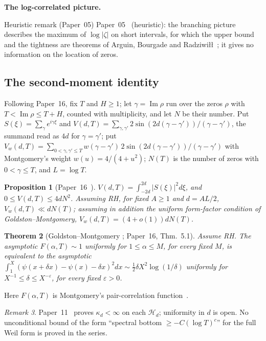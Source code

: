 \documentclass[11pt]{amsart}
\newtheorem{theorem}{Theorem}[section]
\newtheorem{proposition}[theorem]{Proposition}
\theoremstyle{definition}
\theoremstyle{remark}
\newtheorem{remark}[theorem]{Remark}
\renewcommand{\Im}{\operatorname{Im}}
\newcommand{\half}{\tfrac{1}{2}}
\newcommand{\kap}{\kappa}
\newcommand{\gam}{\gamma}
\newcommand{\eps}{\varepsilon}
\begin{document}
\noindent\textbf{The log-correlated picture.}

\begin{nogobox}{Heuristic remark (Paper~05)}
Paper~05~\cite[Sections~6 and~7]{P05} (heuristic): the branching picture describes the
maximum of $\log|\zeta|$ on short intervals, for which the upper bound and the tightness
are theorems of Arguin, Bourgade and Radziwi{\l}{\l}~\cite{ABR20,ABR23}; it gives no information
on the location of zeros.
\end{nogobox}

\subsection{The second-moment identity}

Following Paper~16, fix $T$ and $H\ge1$; let $\gam=\Im\rho$ run over the zeros $\rho$ with
$T<\Im\rho\le T+H$, counted with multiplicity, and let $N$ be their number. Put
$S(\xi)=\sum_\gam e^{i\gam\xi}$ and
$V(d,T)=\sum_{\gam,\gam'}2\sin(2d(\gam-\gam'))/(\gam-\gam')$, the summand read as $4d$ for
$\gam=\gam'$; put
$V_w(d,T)=\sum_{0<\gam,\gam'\le T}w(\gam-\gam')\,2\sin(2d(\gam-\gam'))/(\gam-\gam')$ with
Montgomery's weight $w(u)=4/(4+u^2)$; $N(T)$ is the number of zeros with $0<\gam\le T$, and
$L=\log T$.

\begin{proposition}[{Paper~16~\cite[Thm.~2.1, Prop.~4.1, Cor.~5.2]{P16}}]
\label{thm:LB}
$V(d,T)=\int_{-2d}^{2d}|S(\xi)|^2d\xi$, and $0\le V(d,T)\le4dN^2$.
Assuming RH, for fixed $A\ge1$ and $d=AL/2$, $V_w(d,T)\ll dN(T)$; assuming in addition
the uniform form-factor condition of Goldston--Montgomery, $V_w(d,T)=(4+o(1))dN(T)$.
\end{proposition}

\begin{theorem}[Goldston--Montgomery \cite{GM87}; Paper~16, Thm.~5.1]
Assume RH. The asymptotic $F(\alpha,T)\sim1$ uniformly for $1\le\alpha\le M$, for every
fixed $M$, is equivalent to the asymptotic
$\int_1^X(\psi(x+\delta x)-\psi(x)-\delta x)^2dx\sim\half\delta X^2\log(1/\delta)$
uniformly for $X^{-1}\le\delta\le X^{-\eps}$, for every fixed $\eps>0$.
\end{theorem}

Here $F(\alpha,T)$ is Montgomery's pair-correlation function~\cite{Mon73}.

\begin{remark}
Paper~11~\cite[Prop.~2.1 and Rem.~2.2]{P11} proves $\kap_d<\infty$ on each $\mathcal H_d$; uniformity
in $d$ is open. No unconditional bound of the form ``spectral bottom $\ge-C(\log T)^c$''
for the full Weil form is proved in the series.
\end{remark}
\end{document}
